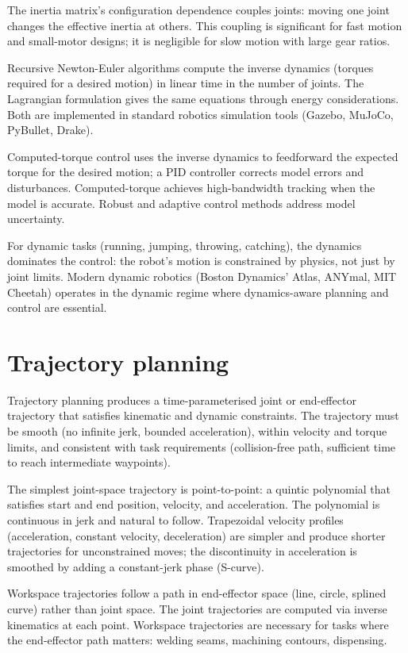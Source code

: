 The inertia matrix's configuration dependence couples joints: moving one joint changes the effective inertia at others. This coupling is significant for fast motion and small-motor designs; it is negligible for slow motion with large gear ratios.

Recursive Newton-Euler algorithms compute the inverse dynamics (torques required for a desired motion) in linear time in the number of joints. The Lagrangian formulation gives the same equations through energy considerations. Both are implemented in standard robotics simulation tools (Gazebo, MuJoCo, PyBullet, Drake).

Computed-torque control uses the inverse dynamics to feedforward the expected torque for the desired motion; a PID controller corrects model errors and disturbances. Computed-torque achieves high-bandwidth tracking when the model is accurate. Robust and adaptive control methods address model uncertainty.

For dynamic tasks (running, jumping, throwing, catching), the dynamics dominates the control: the robot's motion is constrained by physics, not just by joint limits. Modern dynamic robotics (Boston Dynamics' Atlas, ANYmal, MIT Cheetah) operates in the dynamic regime where dynamics-aware planning and control are essential.

\section{Trajectory planning}

Trajectory planning produces a time-parameterised joint or end-effector trajectory that satisfies kinematic and dynamic constraints. The trajectory must be smooth (no infinite jerk, bounded acceleration), within velocity and torque limits, and consistent with task requirements (collision-free path, sufficient time to reach intermediate waypoints).

The simplest joint-space trajectory is point-to-point: a quintic polynomial that satisfies start and end position, velocity, and acceleration. The polynomial is continuous in jerk and natural to follow. Trapezoidal velocity profiles (acceleration, constant velocity, deceleration) are simpler and produce shorter trajectories for unconstrained moves; the discontinuity in acceleration is smoothed by adding a constant-jerk phase (S-curve).

Workspace trajectories follow a path in end-effector space (line, circle, splined curve) rather than joint space. The joint trajectories are computed via inverse kinematics at each point. Workspace trajectories are necessary for tasks where the end-effector path matters: welding seams, machining contours, dispensing.

